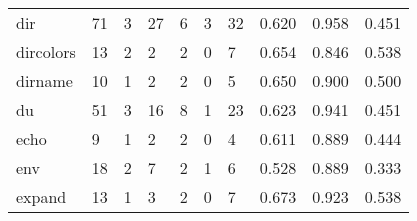 \begin{longtable}{lp{2.0cm}p{2.0cm}p{2.0cm}p{2.0cm}p{2.0cm}p{2.0cm}p{2.0cm}p{2.0cm}p{2.0cm}}
dir       &                     71 &                                             3 &                                           27 &                                           6 &                                            3 &                                         32 &                                0.620 &                                  0.958 &                                0.451 \\
dircolors &                     13 &                                             2 &                                            2 &                                           2 &                                            0 &                                          7 &                                0.654 &                                  0.846 &                                0.538 \\
dirname   &                     10 &                                             1 &                                            2 &                                           2 &                                            0 &                                          5 &                                0.650 &                                  0.900 &                                0.500 \\
du        &                     51 &                                             3 &                                           16 &                                           8 &                                            1 &                                         23 &                                0.623 &                                  0.941 &                                0.451 \\
echo      &                      9 &                                             1 &                                            2 &                                           2 &                                            0 &                                          4 &                                0.611 &                                  0.889 &                                0.444 \\
env       &                     18 &                                             2 &                                            7 &                                           2 &                                            1 &                                          6 &                                0.528 &                                  0.889 &                                0.333 \\
expand    &                     13 &                                             1 &                                            3 &                                           2 &                                            0 &                                          7 &                                0.673 &                                  0.923 &                                0.538 \\

\end{longtable}
